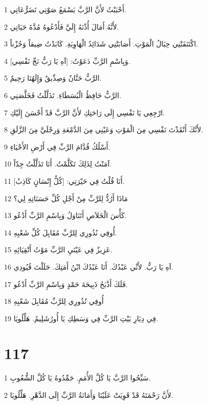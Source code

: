 \par 1 أَحْبَبْتُ لأَنَّ الرَّبَّ يَسْمَعُ صَوْتِي تَضَرُّعَاتِي.
\par 2 لأَنَّهُ أَمَالَ أُذْنَهُ إِلَيَّ فَأَدْعُوهُ مُدَّةَ حَيَاتِي.
\par 3 اكْتَنَفَتْنِي حِبَالُ الْمَوْتِ. أَصَابَتْنِي شَدَائِدُ الْهَاوِيَةِ. كَابَدْتُ ضِيقاً وَحُزْناً.
\par 4 وَبِاسْمِ الرَّبِّ دَعَوْتُ: [آهِ يَا رَبُّ نَجِّ نَفْسِي].
\par 5 الرَّبُّ حَنَّانٌ وَصِدِّيقٌ وَإِلَهُنَا رَحِيمٌ.
\par 6 الرَّبُّ حَافِظُ الْبُسَطَاءِ. تَذَلَّلْتُ فَخَلَّصَنِي.
\par 7 ارْجِعِي يَا نَفْسِي إِلَى رَاحَتِكِ لأَنَّ الرَّبَّ قَدْ أَحْسَنَ إِلَيْكِ.
\par 8 لأَنَّكَ أَنْقَذْتَ نَفْسِي مِنَ الْمَوْتِ وَعَيْنِي مِنَ الدَّمْعَةِ وَرِجْلَيَّ مِنَ الزَّلَقِ.
\par 9 أَسْلُكُ قُدَّامَ الرَّبِّ فِي أَرْضِ الأَحْيَاءِ.
\par 10 آمَنْتُ لِذَلِكَ تَكَلَّمْتُ. أَنَا تَذَلَّلْتُ جِدّاً.
\par 11 أَنَا قُلْتُ فِي حَيْرَتِي: [كُلُّ إِنْسَانٍ كَاذِبٌ].
\par 12 مَاذَا أَرُدُّ لِلرَّبِّ مِنْ أَجْلِ كُلِّ حَسَنَاتِهِ لِي؟
\par 13 كَأْسَ الْخَلاَصِ أَتَنَاوَلُ وَبِاسْمِ الرَّبِّ أَدْعُو.
\par 14 أُوفِي نُذُورِي لِلرَّبِّ مُقَابِلَ كُلِّ شَعْبِهِ.
\par 15 عَزِيزٌ فِي عَيْنَيِ الرَّبِّ مَوْتُ أَتْقِيَائِهِ.
\par 16 آهِ يَا رَبُّ. لأَنِّي عَبْدُكَ. أَنَا عَبْدُكَ ابْنُ أَمَتِكَ. حَلَلْتَ قُيُودِي.
\par 17 فَلَكَ أَذْبَحُ ذَبِيحَةَ حَمْدٍ وَبِاسْمِ الرَّبِّ أَدْعُو.
\par 18 أُوفِي نُذُورِي لِلرَّبِّ مُقَابِلَ شَعْبِهِ
\par 19 فِي دِيَارِ بَيْتِ الرَّبِّ فِي وَسَطِكِ يَا أُورُشَلِيمُ. هَلِّلُويَا.

\chapter{117}

\par 1 سَبِّحُوا الرَّبَّ يَا كُلَّ الأُمَمِ. حَمِّدُوهُ يَا كُلَّ الشُّعُوبِ.
\par 2 لأَنَّ رَحْمَتَهُ قَدْ قَوِيَتْ عَلَيْنَا وَأَمَانَةُ الرَّبِّ إِلَى الدَّهْرِ. هَلِّلُويَا.

